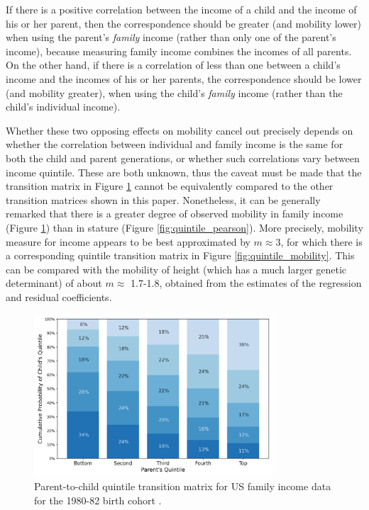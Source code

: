 \documentclass[a4paper,11pt]{article} %
\begin{document}
If there is a positive correlation between the income of a child and the income of his or her parent, then the correspondence should be greater (and mobility lower) when using the parent's \emph{family} income (rather than only one of the parent's income), because measuring family income combines the incomes of all parents. On the other hand, if there is a correlation of less than one between a child's income and the incomes of his or her parents, the correspondence should be lower (and mobility greater), when using the child's \emph{family} income (rather than the child's individual income). 

Whether these two opposing effects on mobility cancel out precisely depends on whether the correlation between individual and family income is the same for both the child and parent generations, or whether such correlations vary between income quintile. These are both unknown, thus the caveat must be made that the transition matrix in Figure \ref{fig:quintile_chetty} cannot be equivalently compared to the other transition matrices shown in this paper. Nonetheless, it can be generally remarked that there is a greater degree of observed mobility in family income (Figure \ref{fig:quintile_chetty}) than in stature (Figure \ref{fig:quintile_pearson}). More precisely, mobility measure for income appears to be best approximated by $m \approx 3$, for which there is a corresponding quintile transition matrix in Figure \ref{fig:quintile_mobility}. This can be compared with the mobility of height (which has a much larger genetic determinant) of about $m \approx$ 1.7-1.8, obtained from the estimates of the regression and residual coefficients.

\begin{figure}[H]
\centering
\advance\leftskip-0.4in
\includegraphics[width=3.5in]{figures/quintile-chetty.png} 
\caption{Parent-to-child quintile transition matrix for US family income data for the 1980-82 birth cohort \cite{chetty}.}
\label{fig:quintile_chetty}
\end{figure}
\end{document}
